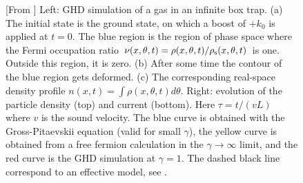 \documentclass[onecolumn,amsfonts,showpacs,superscriptaddress]{revtex4-1}
\begin{document}
\begin{figure}
    \centering
    \caption{[From \citep{dubessy2021universal}] Left: GHD simulation of a gas in an infinite box trap. (a) The initial state is the ground state, on which a boost of $+k_0$ is applied at $t=0$. The blue region is the region of phase space where the Fermi occupation ratio $\nu (x,\theta, t) = \rho(x,\theta, t)/ \rho_{\rm s}(x,\theta, t)$ is one. Outside this region, it is zero. (b) After some time the contour of the blue region gets deformed.  (c) The corresponding real-space density profile $n(x,t) = \int \rho(x,\theta, t) d\theta$. Right: evolution of the particle density (top) and current (bottom). Here $\tau = t/(v L)$ where $v$ is the sound velocity. The blue curve is obtained with the Gross-Pitaevskii equation (valid for small $\gamma$), the yellow curve is obtained from a free fermion calculation in the $\gamma \rightarrow \infty$ limit, and the red curve is the GHD simulation at $\gamma=1$. The dashed black line correspond to an effective model, see \citep{dubessy2021universal}.
    }
    \label{fig:dubessy}
\end{figure}
\end{document}
